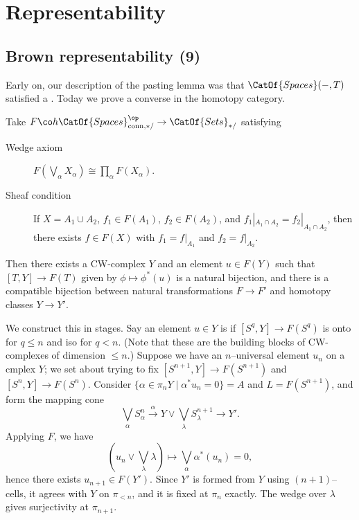 
\chapter{Representability}\label{RepChap}





\section{Brown representability (9)}

Early on, our description of the pasting lemma was that $\CatOf{Spaces}(-, T)$ satisfied a .  Today we prove a converse in the homotopy category.

\begin{theorem}[Brown]
Take $F\co h\CatOf{Spaces}^{\op}_{\mathrm{conn}, */} \to \CatOf{Sets}_{*/}$ satisfying
\begin{description}
    \item[Wedge axiom] $F(\bigvee_\alpha X_\alpha) \cong \prod_\alpha F(X_\alpha)$.
    \item[Sheaf condition] If $X = A_1 \cup A_2$, $f_1 \in F(A_1)$, $f_2 \in F(A_2)$, and $f_1|_{A_1 \cap A_2} = f_2|_{A_1 \cap A_2}$, then there exists $f \in F(X)$ with $f_1 = f|_{A_1}$ and $f_2 = f|_{A_2}$.
\end{description}
Then there exists a CW-complex $Y$ and an element $u \in F(Y)$ such that $[T, Y] \to F(T)$ given by $\phi \mapsto \phi^*(u)$ is a natural bijection, and there is a compatible bijection between natural transformations $F \to F'$ and homotopy classes $Y \to Y'$.
\end{theorem}

We construct this in stages.  Say an element $u \in Y$ is  if $[S^q, Y] \to F(S^q)$ is onto for $q \le n$ and iso for $q < n$.  (Note that these are the building blocks of CW-complexes of dimension $\le n$.)  Suppose we have an $n$--universal element $u_n$ on a cmplex $Y$; we set about trying to fix $[S^{n+1}, Y] \to F(S^{n+1})$ and $[S^n, Y] \to F(S^n)$.  Consider $\{\alpha \in \pi_n Y \mid \alpha^* u_n = 0\} = A$ and $L = F(S^{n+1})$, and form the mapping cone \[\bigvee_\alpha S^n_\alpha \xrightarrow{\alpha} Y \vee \bigvee_\lambda S^{n+1}_\lambda \to Y'.\]  Applying $F$, we have \[(u_n \vee \bigvee_\lambda \lambda) \mapsto \bigvee_\alpha \alpha^*(u_n) = 0,\] hence there exists $u_{n+1} \in F(Y')$.  Since $Y'$ is formed from $Y$ using $(n+1)$--cells, it agrees with $Y$ on $\pi_{< n}$, and it is fixed at $\pi_n$ exactly.  The wedge over $\lambda$ gives surjectivity at $\pi_{n+1}$.

